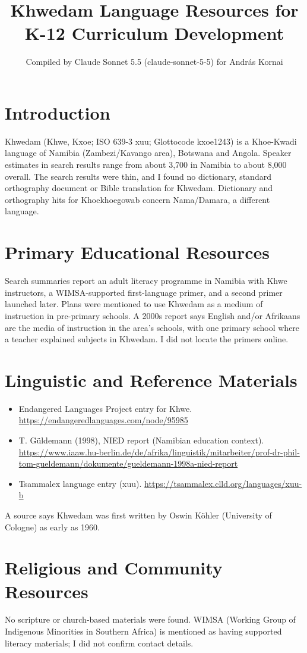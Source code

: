 \documentclass[12pt]{article}
\title{Khwedam Language Resources for K-12 Curriculum Development}
\author{Compiled by Claude Sonnet 5.5 (claude-sonnet-5-5) for Andr\'as Kornai}
\date{}
\begin{document}
\maketitle

\section{Introduction}
Khwedam (Khwe, Kxoe; ISO 639-3 xuu; Glottocode kxoe1243) is a Khoe-Kwadi language of Namibia (Zambezi/Kavango area), Botswana and Angola. Speaker estimates in search results range from about 3,700 in Namibia to about 8,000 overall. The search results were thin, and I found no dictionary, standard orthography document or Bible translation for Khwedam. Dictionary and orthography hits for Khoekhoegowab concern Nama/Damara, a different language.

\section{Primary Educational Resources}
Search summaries report an adult literacy programme in Namibia with Khwe instructors, a WIMSA-supported first-language primer, and a second primer launched later. Plans were mentioned to use Khwedam as a medium of instruction in pre-primary schools. A 2000s report says English and/or Afrikaans are the media of instruction in the area's schools, with one primary school where a teacher explained subjects in Khwedam. I did not locate the primers online.

\section{Linguistic and Reference Materials}
\begin{itemize}
\item Endangered Languages Project entry for Khwe. \url{https://endangeredlanguages.com/node/95985}
\item T. G\"uldemann (1998), NIED report (Namibian education context). \url{https://www.iaaw.hu-berlin.de/de/afrika/linguistik/mitarbeiter/prof-dr-phil-tom-gueldemann/dokumente/gueldemann-1998a-nied-report}
\item Tsammalex language entry (xuu). \url{https://tsammalex.clld.org/languages/xuu-b}
\end{itemize}
A source says Khwedam was first written by Oswin K\"ohler (University of Cologne) as early as 1960.

\section{Religious and Community Resources}
No scripture or church-based materials were found. WIMSA (Working Group of Indigenous Minorities in Southern Africa) is mentioned as having supported literacy materials; I did not confirm contact details.
\end{document}

